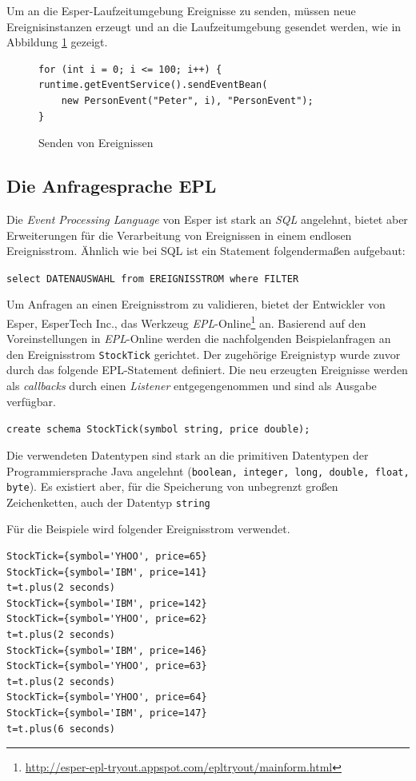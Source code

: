 \documentclass{acm_proc_article-sp}
\begin{document}
Um an die Esper-Laufzeitumgebung Ereignisse zu senden, müssen neue Ereignisinstanzen 
erzeugt und an die Laufzeitumgebung gesendet werden, wie in Abbildung \ref{java:03}
gezeigt.


\begin{figure}[H]    
\begin{verbatim}
for (int i = 0; i <= 100; i++) {
runtime.getEventService().sendEventBean(
    new PersonEvent("Peter", i), "PersonEvent");
}
\end{verbatim}
\caption{Senden von Ereignissen}
\label{java:03}
\end{figure}

\subsection{Die Anfragesprache EPL}\label{kap:epl}
\vspace{0.1cm}
Die \textit{Event Processing Language} von Esper ist stark an \textit{SQL} angelehnt, 
bietet aber Erweiterungen für die Verarbeitung von Ereignissen in einem endlosen 
Ereignisstrom. Ähnlich wie bei SQL ist ein Statement 
folgendermaßen aufgebaut:

\texttt{select DATENAUSWAHL from EREIGNISSTROM where FILTER}

Um Anfragen an einen Ereignisstrom zu validieren, bietet der Entwickler von Esper, 
EsperTech Inc., das Werkzeug 
\textit{EPL}-Online\footnote{\url{http://esper-epl-tryout.appspot.com/epltryout/mainform.html}}
an. Basierend auf den 
Voreinstellungen in \textit{EPL}-Online werden die nachfolgenden Beispielanfragen an den 
Ereignisstrom \texttt{StockTick} gerichtet. Der zugehörige Ereignistyp wurde zuvor durch 
das folgende EPL-Statement definiert. Die neu erzeugten Ereignisse werden als 
\textit{callbacks} durch einen \textit{Listener} entgegengenommen und sind als Ausgabe 
verfügbar.

\texttt{create schema StockTick(symbol string, price double);}

Die verwendeten Datentypen sind stark an die primitiven Datentypen der Programmiersprache 
Java angelehnt (\texttt{boolean, integer, long, double, float, byte}). Es existiert aber, 
für die Speicherung von unbegrenzt großen Zeichenketten, auch der Datentyp \texttt{string}

Für die Beispiele wird folgender Ereignisstrom verwendet.

\begin{verbatim}
StockTick={symbol='YHOO', price=65}
StockTick={symbol='IBM', price=141}
t=t.plus(2 seconds)
StockTick={symbol='IBM', price=142}
StockTick={symbol='YHOO', price=62}
t=t.plus(2 seconds)
StockTick={symbol='IBM', price=146}
StockTick={symbol='YHOO', price=63}
t=t.plus(2 seconds)
StockTick={symbol='YHOO', price=64}
StockTick={symbol='IBM', price=147}
t=t.plus(6 seconds)
\end{verbatim}
\end{document}
